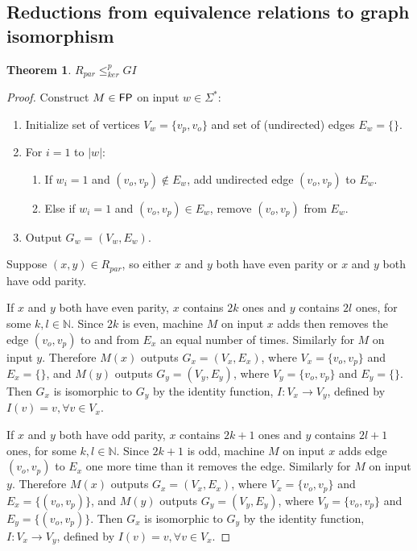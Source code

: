 \documentclass{article}
\newtheorem{theorem}{Theorem}[section]
\theoremstyle{definition}
\newcommand{\sigmastar}{\Sigma^{*}}
\newcommand{\kr}{\leq^{p}_{ker}} %
\begin{document}
\subsection{Reductions from equivalence relations to graph isomorphism}
\begin{theorem}\label{thm:rpar-gi}$R_{par}\kr GI$\end{theorem}
\begin{proof}
  Construct $M\in {\ensuremath{\mathsf{FP}}}$ on input $w\in\sigmastar$:
  \begin{enumerate}
  \item Initialize set of vertices $V_w=\{v_{p}, v_{o}\}$ and set of
    (undirected) edges $E_w=\{\}$.
  \item For $i=1$ to $|w|$:
    \begin{enumerate}
    \item If $w_i=1$ and $(v_{o}, v_{p})\notin E_w$, add undirected edge
      $(v_{o}, v_{p})$ to $E_w$.
    \item Else if $w_i=1$ and $(v_{o}, v_{p})\in E_w$, remove $(v_{o}, v_{p})$
      from $E_w$.
    \end{enumerate}
  \item Output $G_w=(V_w,E_w)$.
  \end{enumerate}

  Suppose $(x, y)\in R_{par}$, so either $x$ and $y$ both have even parity or
  $x$ and $y$ both have odd parity. 

  If $x$ and $y$ both have even parity, $x$ contains $2k$ ones and $y$ contains
  $2l$ ones, for some $k,l\in\mathbb{N}$. Since $2k$ is even, machine $M$ on
  input $x$ adds then removes the edge $(v_o, v_p)$ to and from $E_x$ an equal
  number of times. Similarly for $M$ on input $y$. Therefore $M(x)$ outputs
  $G_x=(V_x, E_x)$, where $V_x=\{v_o, v_p\}$ and $E_x=\{\}$, and $M(y)$ outputs
  $G_y=(V_y, E_y)$, where $V_y=\{v_o, v_p\}$ and $E_y=\{\}$. Then $G_x$ is
  isomorphic to $G_y$ by the identity function, $I:V_x\to V_y$, defined by
  $I(v)=v, \forall v\in V_x$.

  If $x$ and $y$ both have odd parity, $x$ contains $2k+1$ ones and $y$
  contains $2l+1$ ones, for some $k,l\in\mathbb{N}$. Since $2k+1$ is odd,
  machine $M$ on input $x$ adds edge $(v_o, v_p)$ to $E_x$ one more time than
  it removes the edge. Similarly for $M$ on input $y$. Therefore $M(x)$ outputs
  $G_x=(V_x, E_x)$, where $V_x=\{v_o, v_p\}$ and $E_x=\{(v_o, v_p)\}$, and
  $M(y)$ outputs $G_y=(V_y, E_y)$, where $V_y=\{v_o, v_p\}$ and $E_y=\{(v_o,
  v_p)\}$. Then $G_x$ is isomorphic to $G_y$ by the identity function,
  $I:V_x\to V_y$, defined by $I(v)=v, \forall v\in V_x$.


\end{proof}
\end{document}
